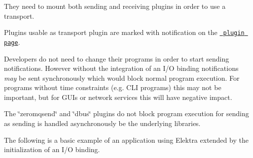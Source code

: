 They need to mount both sending and receiving plugins in order to use a transport.


\begin{DoxyCode}{0}
\end{DoxyCode}


Plugins usable as transport plugin are marked with {\ttfamily notification} on the \href{https://www.libelektra.org/plugins/readme\#notification-and-logging}{\texttt{ plugin page}}.

Developers do not need to change their programs in order to start sending notifications. However without the integration of an I/O binding notifications {\itshape may} be sent synchronously which would block normal program execution. For programs without time constraints (e.\+g. C\+LI programs) this may not be important, but for G\+U\+Is or network services this will have negative impact.

The \char`\"{}zeromqsend\char`\"{} and \char`\"{}dbus\char`\"{} plugins do not block program execution for sending as sending is handled asynchronously be the underlying libraries.

The following is a basic example of an application using Elektra extended by the initialization of an I/O binding.


